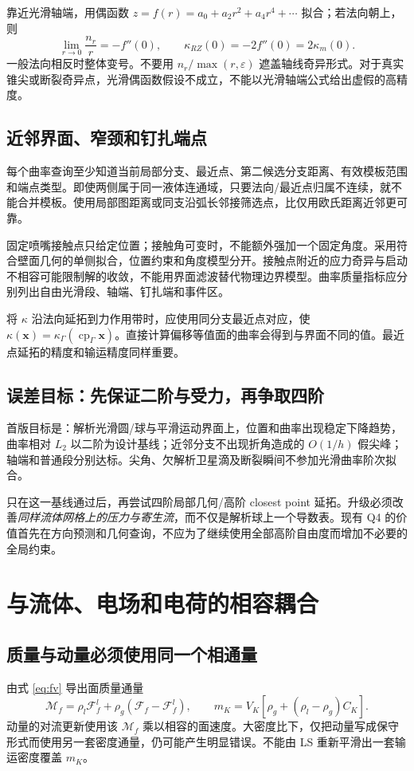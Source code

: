 \documentclass[11pt,a4paper]{article}
\newcommand{\vct}[1]{\boldsymbol{#1}}
\begin{document}
靠近光滑轴端，用偶函数 $z=f(r)=a_0+a_2r^2+a_4r^4+\cdots$ 拟合；若法向朝上，则
\begin{equation}
 \lim_{r\to0}\frac{n_r}{r}=-f''(0),\qquad
 \kappa_{RZ}(0)=-2f''(0)=2\kappa_m(0).
\end{equation}
一般法向相反时整体变号。不要用 $n_r/\max(r,\varepsilon)$ 遮盖轴线奇异形式。对于真实锥尖或断裂奇异点，光滑偶函数假设不成立，不能以光滑轴端公式给出虚假的高精度。

\subsection{近邻界面、窄颈和钉扎端点}
每个曲率查询至少知道当前局部分支、最近点、第二候选分支距离、有效模板范围和端点类型。即使两侧属于同一液体连通域，只要法向/最近点归属不连续，就不能合并模板。使用局部图距离或同支沿弧长邻接筛选点，比仅用欧氏距离近邻更可靠。

固定喷嘴接触点只给定位置；接触角可变时，不能额外强加一个固定角度。采用符合壁面几何的单侧拟合，位置约束和角度模型分开。接触点附近的应力奇异与启动不相容可能限制解的收敛，不能用界面滤波替代物理边界模型。曲率质量指标应分别列出自由光滑段、轴端、钉扎端和事件区。

将 $\kappa$ 沿法向延拓到力作用带时，应使用同分支最近点对应，使 $\kappa(\vct x)=\kappa_\Gamma(\operatorname{cp}_\Gamma\vct x)$。直接计算偏移等值面的曲率会得到与界面不同的值。最近点延拓的精度和输运精度同样重要\cite{coquerelle2016,henri2022}。

\subsection{误差目标：先保证二阶与受力，再争取四阶}
首版目标是：解析光滑圆/球与平滑运动界面上，位置和曲率出现稳定下降趋势，曲率相对 $L_2$ 以二阶为设计基线；近邻分支不出现折角造成的 $O(1/h)$ 假尖峰；轴端和普通段分别达标。尖角、欠解析卫星滴及断裂瞬间不参加光滑曲率阶次拟合。

只在这一基线通过后，再尝试四阶局部几何/高阶 closest point 延拓。升级必须改善\emph{同样流体网格上的压力与寄生流}，而不仅是解析球上一个导数表。现有 Q4 的价值首先在方向预测和几何查询，不应为了继续使用全部高阶自由度而增加不必要的全局约束。

\clearpage
\section{与流体、电场和电荷的相容耦合}
\subsection{质量与动量必须使用同一个相通量}
由式 \eqref{eq:fv} 导出面质量通量
\begin{equation}
 \mathcal M_f=\rho_l\mathcal F_f^l+\rho_g(\mathcal F_f-\mathcal F_f^l),\qquad
 m_K=V_K[\rho_g+(\rho_l-\rho_g)C_K].
\end{equation}
动量的对流更新使用该 $\mathcal M_f$ 乘以相容的面速度。大密度比下，仅把动量写成保守形式而使用另一套密度通量，仍可能产生明显错误\cite{raessi2012}。不能由 LS 重新平滑出一套输运密度覆盖 $m_K$。
\end{document}
